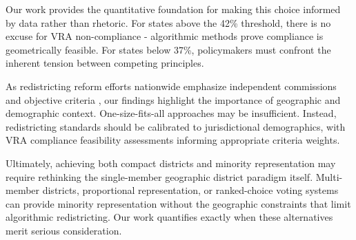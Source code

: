 Our work provides the quantitative foundation for making this choice informed by data rather than rhetoric. For states above the 42\% threshold, there is no excuse for VRA non-compliance - algorithmic methods prove compliance is geometrically feasible. For states below 37\%, policymakers must confront the inherent tension between competing principles.

As redistricting reform efforts nationwide emphasize independent commissions and objective criteria \citep{levitt2010}, our findings highlight the importance of geographic and demographic context. One-size-fits-all approaches may be insufficient. Instead, redistricting standards should be calibrated to jurisdictional demographics, with VRA compliance feasibility assessments informing appropriate criteria weights.

Ultimately, achieving both compact districts and minority representation may require rethinking the single-member geographic district paradigm itself. Multi-member districts, proportional representation, or ranked-choice voting systems can provide minority representation without the geographic constraints that limit algorithmic redistricting. Our work quantifies exactly when these alternatives merit serious consideration.
